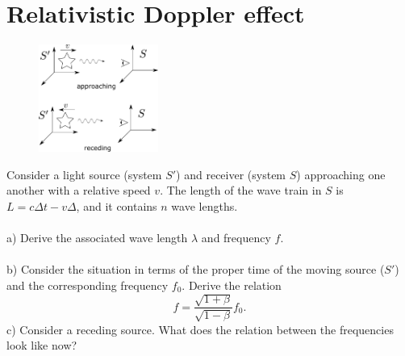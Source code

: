 \documentclass{article}
\begin{document}
    \newpage
    \section{Relativistic Doppler effect}
        \begin{figure}
            \includegraphics[width=0.35\textwidth]{figures/figure_1.pdf}
        \end{figure}
        Consider a light source (system $S'$) and receiver (system $S$) approaching one another with a relative speed $v$. The length of the wave train in $S$ is $L = c \Delta t - v \Delta$, and it contains $n$ wave lengths. \\ \\
        a) Derive the associated wave length $\lambda$ and frequency $f$. \\ \\
        b) Consider the situation in terms of the proper time of the moving source ($S'$) and the corresponding frequency $f_0$. Derive the relation 
        \begin{equation*}
            f = \frac{\sqrt{1 + \beta}}{\sqrt{1 - \beta}}f_0.
        \end{equation*}
        c) Consider a receding source. What does the relation between the frequencies look like now? 
\end{document}
